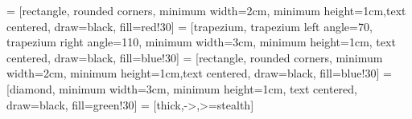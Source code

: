 \newcommand{\titleframe}{%
  \begin{frame}[plain]
    \titlepage
  \end{frame}
}

 = [rectangle, rounded corners, minimum width=2cm, minimum height=1cm,text centered, draw=black, fill=red!30]
 = [trapezium, trapezium left angle=70, trapezium right angle=110, minimum width=3cm, minimum height=1cm, text centered, draw=black, fill=blue!30]
 = [rectangle, rounded corners, minimum width=2cm, minimum height=1cm,text centered, draw=black, fill=blue!30]
 = [diamond, minimum width=3cm, minimum height=1cm, text centered, draw=black, fill=green!30]
 = [thick,->,>=stealth]

\usepackage{animate}


